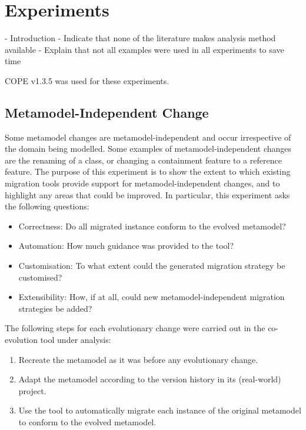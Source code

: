 
\chapter{Experiments}

- Introduction
- Indicate that none of the literature makes analysis method available
- Explain that not all examples were used in all experiments to save time

COPE v1.3.5 was used for these experiments.


\section{Metamodel-Independent Change}
Some metamodel changes are metamodel-independent and occur irrespective of the domain being modelled. Some examples of metamodel-independent changes are the renaming of a class, or changing a containment feature to a reference feature. The purpose of this experiment is to show the extent to which existing migration tools provide support for metamodel-independent changes, and to highlight any areas that could be improved. In particular, this experiment asks the following questions:

\begin{itemize}
	\item Correctness: Do all migrated instance conform to the evolved metamodel?
	\item Automation: How much guidance was provided to the tool?
  \item Customisation: To what extent could the generated migration strategy be customised?
  \item Extensibility: How, if at all, could new metamodel-independent migration strategies be added?
\end{itemize}

The following steps for each evolutionary change were carried out in the co-evolution tool under analysis:

\begin{enumerate}
	\item Recreate the metamodel as it was before any evolutionary change.
	\item Adapt the metamodel according to the version history in its (real-world) project.
	\item Use the tool to automatically migrate each instance of the original metamodel to conform to the evolved metamodel.
\end{enumerate}

